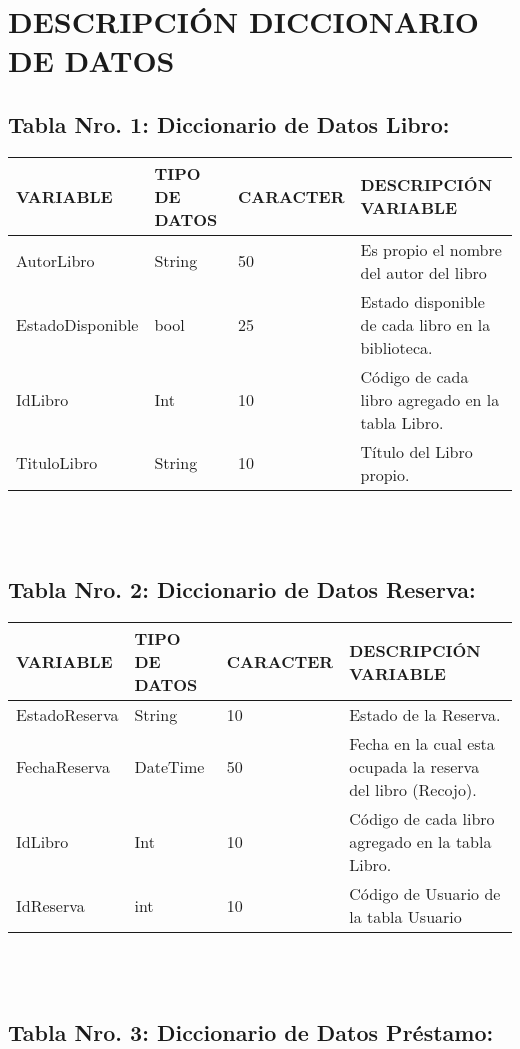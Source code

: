 \documentclass{article}
\begin{document}
\section{DESCRIPCIÓN DICCIONARIO DE DATOS}

\subsection{Tabla Nro. 1: Diccionario de Datos Libro:}

\begin{tabular}{|p{25mm}|l|p{20mm}|p{50mm}|}\hline
 
VARIABLE  & TIPO DE DATOS  & CARACTER & DESCRIPCIÓN VARIABLE\\\hline
AutorLibro & String & 50 & Es propio el nombre del autor del libro\\\hline
EstadoDisponible & bool & 25 & Estado disponible de cada libro en la biblioteca.\\\hline
IdLibro & Int & 10 & Código de cada libro agregado en la tabla Libro.\\\hline
TituloLibro & String & 10 & Título del Libro propio.\\\hline
\end{tabular}
\\
\\
\subsection{Tabla Nro. 2: Diccionario de Datos Reserva:}

\begin{tabular}{|p{25mm}|l|p{20mm}|p{50mm}|}\hline
 
VARIABLE  & TIPO DE DATOS  & CARACTER & DESCRIPCIÓN VARIABLE\\\hline
EstadoReserva & String & 10 & Estado de la Reserva.\\\hline
FechaReserva & DateTime & 50 & Fecha en la cual esta ocupada la reserva del libro (Recojo).\\\hline
IdLibro & Int & 10 & Código de cada libro agregado en la tabla Libro.\\\hline
IdReserva & int & 10 & Código de Usuario de la tabla Usuario\\\hline
\end{tabular}
\\
\\
\subsection{Tabla Nro. 3: Diccionario de Datos Préstamo:}
\end{document}

